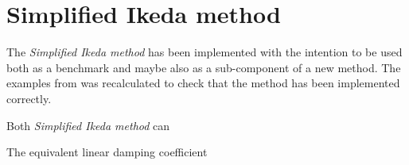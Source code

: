 \section{Simplified Ikeda method}
\label{se:simplified_ikeda}
The \emph{Simplified Ikeda method} \cite{kawahara_simple_2011} has been implemented with the intention to be used both as a benchmark and maybe also as a sub-component of a new method. The examples from \cite{kawahara_simple_2011} was recalculated to check that the method has been implemented correctly.

Both  \emph{Simplified Ikeda method} can

The equivalent linear damping coefficient 

